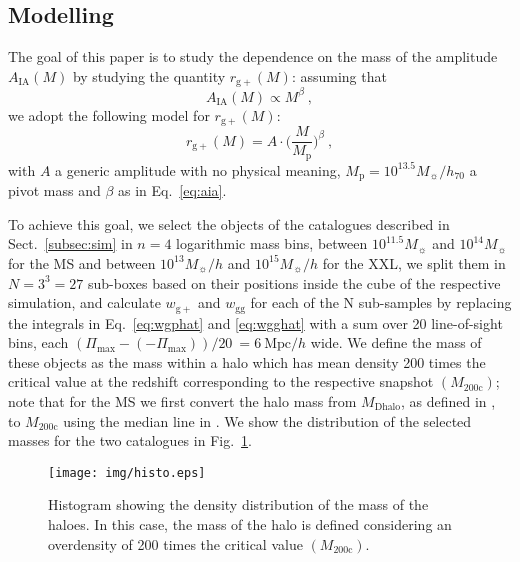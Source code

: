 \documentclass[a4paper,fleqn,usenatbib]{mnras}
\begin{document}
\subsection{Modelling}
\label{subsec:modelling}
The goal of this paper is to study the dependence on the mass of the amplitude $A_{\mathrm{IA}} (M)$ by studying the quantity $r_{\mathrm{g+}} (M)$: assuming that
\begin{equation}
A_{\mathrm{IA}} (M)\propto M^{\beta} \ , 
	\label{eq:aia}
\end{equation}
we adopt the following model for $r_{\mathrm{g+}} (M)$:
\begin{equation}
    r_{\mathrm{g+}} (M) = A \cdot  \biggl ( \frac{M}{M_{\mathrm{p}}} \biggl )^{\beta} \ ,
	\label{eq:modelrg+}
\end{equation}
with $A$ a generic amplitude with no physical meaning, $M_{\mathrm{p}} = 10^{13.5} M_{\sun}/h_{70}$ a pivot mass and $\beta$ as in Eq.~\ref{eq:aia}.

To achieve this goal, we select the objects of the catalogues described in Sect.~\ref{subsec:sim} in $n = 4$ logarithmic mass bins, between $10^{11.5} M_{\sun}$ and $10^{14} M_{\sun}$ for the MS and between $10^{13} M_{\sun}/h$ and $10^{15} M_{\sun}/h$ for the XXL, we split them in $N = 3^3 = 27$ sub-boxes based on their positions inside the cube of the respective simulation, and calculate $w_{\mathrm{g+}}$ and $w_{\mathrm{gg}}$ for each of the N sub-samples by replacing the integrals in Eq.~\ref{eq:wgphat} and \ref{eq:wgghat} with a sum over 20 line-of-sight bins, each $(\Pi_{\mathrm{max}} - (-\Pi_{\mathrm{max}}))/ 20 \ = 6 \ \mbox{Mpc}/h$ wide. We define the mass of these objects as the mass within a halo which has mean density 200 times the critical value at the redshift corresponding to the respective snapshot $(M_{200\mathrm{c}})$; note that for the MS we first convert the halo mass from $M_{\mathrm{Dhalo}}$, as defined in \citet{Jiangetal2014}, to $M_{200\mathrm{c}}$ using the median line in \citet[figure 2]{Jiangetal2014}. We show the distribution of the selected masses for the two catalogues in Fig.~\ref{fig:histo}. 
\begin{figure}
	\centerline{
	\texttt{[image: img/histo.eps]}}
	\caption{Histogram showing the density distribution of the mass of the haloes.
	In this case, the mass of the halo is defined considering an overdensity of 200 times the critical value $(M_{200\mathrm{c}})$.}
	\label{fig:histo}
\end{figure}
\end{document}
